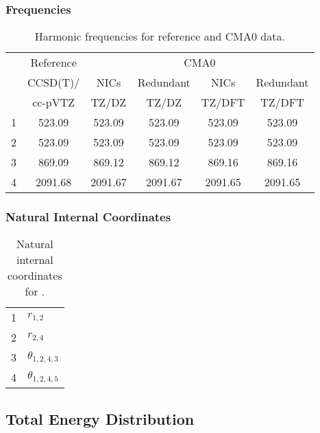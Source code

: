 \documentclass[10pt,oneside]{article}
\begin{document}
\begin{table}[h!]
\subsubsection*{Frequencies}
\centering
\caption{Harmonic frequencies for reference and CMA0 data.}
\begin{tabular}{cccccc}
\toprule
{} & Reference & \multicolumn{4}{c}{CMA0} \\
{} &  CCSD(T)/ &    NICs &  Redundant &    NICs & Redundant \\
{} &   cc-pVTZ &   TZ/DZ &      TZ/DZ &  TZ/DFT &    TZ/DFT \\
\midrule
1 &    523.09 &  523.09 &     523.09 &  523.09 &    523.09 \\
2 &    523.09 &  523.09 &     523.09 &  523.09 &    523.09 \\
3 &    869.09 &  869.12 &     869.12 &  869.16 &    869.16 \\
4 &   2091.68 & 2091.67 &    2091.67 & 2091.65 &   2091.65 \\
\bottomrule
\end{tabular}
\end{table}

\begin{table}[h!]
\subsubsection*{Natural Internal Coordinates}
\centering
\caption{Natural internal coordinates for .}
\small
\begin{tabular}{ll}
\toprule
  1   & $r_{1,2}$ \\
  2   & $r_{2,4}$ \\
  3   & $\theta_{1,2,4,3}$ \\
  4   & $\theta_{1,2,4,5}$ \\
\bottomrule
\end{tabular}
\end{table}

\begin{table}
\subsection*{Total Energy Distribution}
\centering\end{table}

\clearpage

\subsection{}
\end{document}
